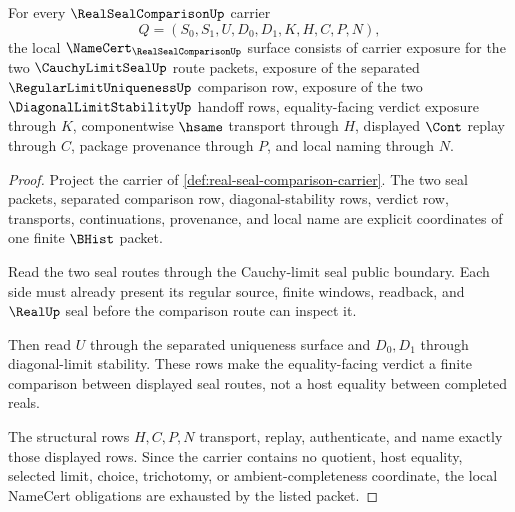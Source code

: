 \begin{theorem}
\label{thm:real-seal-comparison-namecert-obligations}
For every $\RealSealComparisonUp$ carrier
$$
Q=(S_0,S_1,U,D_0,D_1,K,H,C,P,N),
$$
the local $\NameCert_{\RealSealComparisonUp}$ surface consists of carrier exposure for the two $\CauchyLimitSealUp$ route packets, exposure of the separated $\RegularLimitUniquenessUp$ comparison row, exposure of the two $\DiagonalLimitStabilityUp$ handoff rows, equality-facing verdict exposure through $K$, componentwise $\hsame$ transport through $H$, displayed $\Cont$ replay through $C$, package provenance through $P$, and local naming through $N$.
\end{theorem}
\begin{proof}
Project the carrier of \autoref{def:real-seal-comparison-carrier}. The two seal packets, separated comparison row, diagonal-stability rows, verdict row, transports, continuations, provenance, and local name are explicit coordinates of one finite $\BHist$ packet.

Read the two seal routes through the Cauchy-limit seal public boundary. Each side must already present its regular source, finite windows, readback, and $\RealUp$ seal before the comparison route can inspect it.

Then read $U$ through the separated uniqueness surface and $D_0,D_1$ through diagonal-limit stability. These rows make the equality-facing verdict a finite comparison between displayed seal routes, not a host equality between completed reals.

The structural rows $H,C,P,N$ transport, replay, authenticate, and name exactly those displayed rows. Since the carrier contains no quotient, host equality, selected limit, choice, trichotomy, or ambient-completeness coordinate, the local NameCert obligations are exhausted by the listed packet.
\end{proof}


